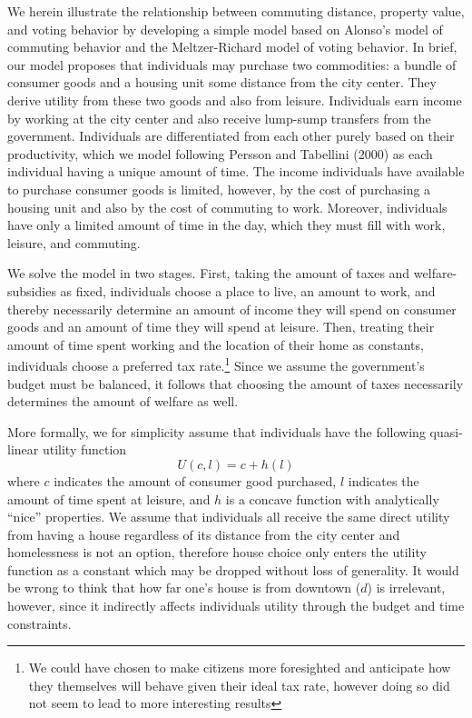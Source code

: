 \documentclass[11.0pt]{article}
\theoremstyle{definition}
\begin{document}
We herein illustrate the relationship between commuting distance, property value, and voting behavior by developing a simple model based on Alonso's model of commuting behavior and the Meltzer-Richard model of voting behavior. In brief, our model proposes that individuals may purchase two commodities: a bundle of consumer goods and a housing unit some distance from the city center. They derive utility from these two goods and also from leisure. Individuals earn income by working at the city center and also receive lump-sump transfers from the government. Individuals are differentiated from each other purely based on their productivity, which we model following Persson and Tabellini (2000) as each individual having a unique amount of time. The income individuals have available to purchase consumer goods is limited, however, by the cost of purchasing a housing unit and also by the cost of commuting to work. Moreover, individuals have only a limited amount of time in the day, which they must fill with work, leisure, and commuting. 

We solve the model in two stages. First, taking the amount of taxes and welfare-subsidies as fixed, individuals choose a place to live, an amount to work, and thereby necessarily determine an amount of income they will spend on consumer goods and an amount of time they will spend at leisure. Then, treating their amount of time spent working and the location of their home as constants, individuals choose a preferred tax rate.\footnote{We could have chosen to make citizens more foresighted and anticipate how they themselves will behave given their ideal tax rate, however doing so did not seem to lead to more interesting results} Since we assume the government's budget must be balanced, it follows that choosing the amount of taxes necessarily determines the amount of welfare as well.

More formally, we for simplicity assume that individuals have the following quasi-linear utility function
$$ U(c,l) = c + h(l) $$
\noindent where $c$ indicates the amount of consumer good purchased, $l$ indicates the amount of time spent at leisure, and $h$ is a concave function with analytically ``nice'' properties. We assume that individuals all receive the same direct utility from having a house regardless of its distance from the city center and homelessness is not an option, therefore house choice only enters the utility function as a constant which may be dropped without loss of generality. It would be wrong to think that how far one's house is from downtown ($d$) is irrelevant, however, since it indirectly affects individuals utility through the budget and time constraints.
\end{document}
